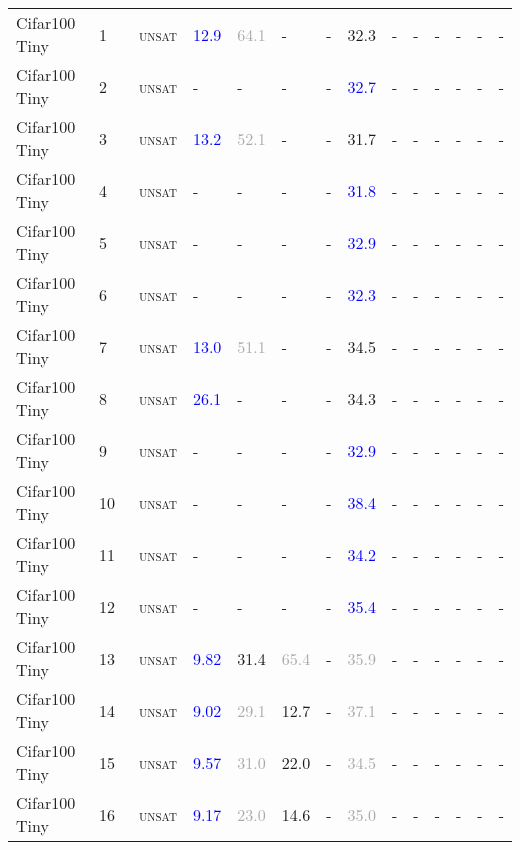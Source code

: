 \begin{center}
{\begin{longtable}{@{}llllllllllllll@{}}
Cifar100 Tiny & 1 & ~\textsc{unsat} & \textcolor{blue}{12.9} & \textcolor{darkgray}{64.1} & - & - & \textcolor{second}{32.3} & - & - & - & - & - & - \\
Cifar100 Tiny & 2 & ~\textsc{unsat} & - & - & - & - & \textcolor{blue}{32.7} & - & - & - & - & - & - \\
Cifar100 Tiny & 3 & ~\textsc{unsat} & \textcolor{blue}{13.2} & \textcolor{darkgray}{52.1} & - & - & \textcolor{second}{31.7} & - & - & - & - & - & - \\
Cifar100 Tiny & 4 & ~\textsc{unsat} & - & - & - & - & \textcolor{blue}{31.8} & - & - & - & - & - & - \\
Cifar100 Tiny & 5 & ~\textsc{unsat} & - & - & - & - & \textcolor{blue}{32.9} & - & - & - & - & - & - \\
Cifar100 Tiny & 6 & ~\textsc{unsat} & - & - & - & - & \textcolor{blue}{32.3} & - & - & - & - & - & - \\
Cifar100 Tiny & 7 & ~\textsc{unsat} & \textcolor{blue}{13.0} & \textcolor{darkgray}{51.1} & - & - & \textcolor{second}{34.5} & - & - & - & - & - & - \\
Cifar100 Tiny & 8 & ~\textsc{unsat} & \textcolor{blue}{26.1} & - & - & - & \textcolor{second}{34.3} & - & - & - & - & - & - \\
Cifar100 Tiny & 9 & ~\textsc{unsat} & - & - & - & - & \textcolor{blue}{32.9} & - & - & - & - & - & - \\
Cifar100 Tiny & 10 & ~\textsc{unsat} & - & - & - & - & \textcolor{blue}{38.4} & - & - & - & - & - & - \\
Cifar100 Tiny & 11 & ~\textsc{unsat} & - & - & - & - & \textcolor{blue}{34.2} & - & - & - & - & - & - \\
Cifar100 Tiny & 12 & ~\textsc{unsat} & - & - & - & - & \textcolor{blue}{35.4} & - & - & - & - & - & - \\
Cifar100 Tiny & 13 & ~\textsc{unsat} & \textcolor{blue}{9.82} & \textcolor{second}{31.4} & \textcolor{darkgray}{65.4} & - & \textcolor{darkgray}{35.9} & - & - & - & - & - & - \\
Cifar100 Tiny & 14 & ~\textsc{unsat} & \textcolor{blue}{9.02} & \textcolor{darkgray}{29.1} & \textcolor{second}{12.7} & - & \textcolor{darkgray}{37.1} & - & - & - & - & - & - \\
Cifar100 Tiny & 15 & ~\textsc{unsat} & \textcolor{blue}{9.57} & \textcolor{darkgray}{31.0} & \textcolor{second}{22.0} & - & \textcolor{darkgray}{34.5} & - & - & - & - & - & - \\
Cifar100 Tiny & 16 & ~\textsc{unsat} & \textcolor{blue}{9.17} & \textcolor{darkgray}{23.0} & \textcolor{second}{14.6} & - & \textcolor{darkgray}{35.0} & - & - & - & - & - & - \\

\end{longtable}}
\end{center}
